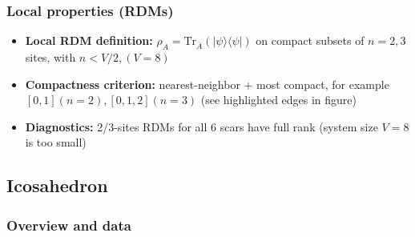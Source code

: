 \documentclass[11pt,a4paper]{article}
\begin{document}
\subsubsection*{Local properties (RDMs)}

\begin{itemize}[leftmargin=1.5em]
  \item \textbf{Local RDM definition:} $\rho_A=\mathrm{Tr}_{\bar A}(|\psi\rangle\langle\psi|)$ on compact subsets of $n=2,3$ sites, with $n < V/2, (V = 8)$
  \item \textbf{Compactness criterion:} nearest-neighbor + most compact, for example $[0,1] (n = 2), [0,1,2] (n = 3)$ (see highlighted edges in figure)
  \item \textbf{Diagnostics:} 2/3-sites RDMs for all 6 scars have full rank (system size $V=8$ is too small)
\end{itemize}


\subsection*{Icosahedron}

\subsubsection*{Overview and data}
\end{document}
